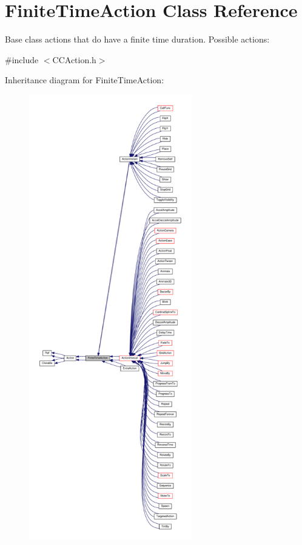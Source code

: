 \hypertarget{classFiniteTimeAction}{}\section{Finite\+Time\+Action Class Reference}
\label{classFiniteTimeAction}


Base class actions that do have a finite time duration. Possible actions\+:  




{\ttfamily \#include $<$C\+C\+Action.\+h$>$}



Inheritance diagram for Finite\+Time\+Action\+:
\nopagebreak
\begin{figure}[H]
\begin{center}
\leavevmode
\includegraphics[height=550pt]{classFiniteTimeAction__inherit__graph}
\end{center}
\end{figure}



